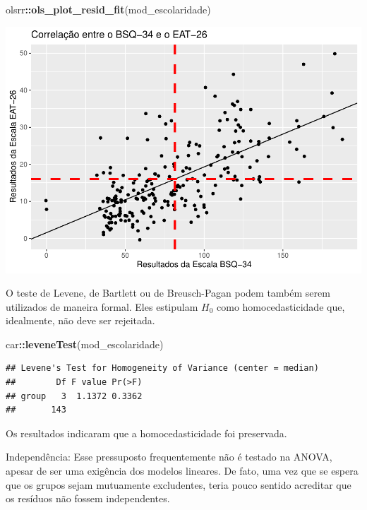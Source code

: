 \documentclass[
]{book}
\newenvironment{Shaded}{\begin{snugshade}}{\end{snugshade}}
\newcommand{\KeywordTok}[1]{\textcolor[rgb]{0.13,0.29,0.53}{\textbf{#1}}}
\newcommand{\NormalTok}[1]{#1}
\newcommand{\OperatorTok}[1]{\textcolor[rgb]{0.81,0.36,0.00}{\textbf{#1}}}
\begin{document}
\begin{Shaded}
\begin{Highlighting}[]
\NormalTok{olsrr}\OperatorTok{::}\KeywordTok{ols_plot_resid_fit}\NormalTok{(mod_escolaridade)}
\end{Highlighting}
\end{Shaded}

\begin{center}\includegraphics{gitbook-demo_files/figure-latex/unnamed-chunk-83-1} \end{center}

O teste de Levene, de Bartlett ou de Breusch-Pagan podem também serem utilizados de maneira formal. Eles estipulam \(H_0\) como homocedasticidade que, idealmente, não deve ser rejeitada.

\begin{Shaded}
\begin{Highlighting}[]
\NormalTok{car}\OperatorTok{::}\KeywordTok{leveneTest}\NormalTok{(mod_escolaridade)}
\end{Highlighting}
\end{Shaded}

\begin{verbatim}
## Levene's Test for Homogeneity of Variance (center = median)
##        Df F value Pr(>F)
## group   3  1.1372 0.3362
##       143
\end{verbatim}

Os resultados indicaram que a homocedasticidade foi preservada.

Independência: Esse pressuposto frequentemente não é testado na ANOVA, apesar de ser uma exigência dos modelos lineares. De fato, uma vez que se espera que os grupos sejam mutuamente excludentes, teria pouco sentido acreditar que os resíduos não fossem independentes.
\end{document}
